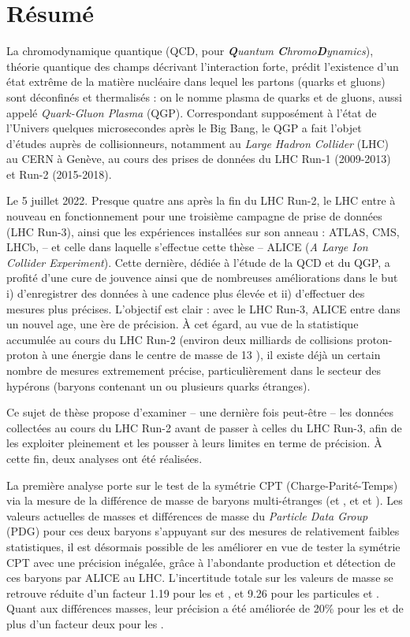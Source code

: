 \chapter*{Résumé}
    
La chromodynamique quantique (QCD, pour \textit{\textbf{Q}uantum \textbf{C}hromo\textbf{D}ynamics}), théorie quantique des champs décrivant l’interaction forte, prédit l’existence d’un état extrême de la matière nucléaire dans lequel les partons (quarks et gluons) sont déconfinés et thermalisés : on le nomme plasma de quarks et de gluons, aussi appelé \textit{Quark-Gluon Plasma} (QGP). Correspondant supposément à l’état de l’Univers quelques microsecondes après le Big Bang, le QGP a fait l’objet d’études auprès de collisionneurs, notamment au \textit{Large Hadron Collider} (LHC) au CERN à Genève, au cours des prises de données du LHC Run-1 (2009-2013) et Run-2 (2015-2018). 

Le 5 juillet 2022. Presque quatre ans après la fin du LHC Run-2, le LHC entre à nouveau en fonctionnement pour une troisième campagne de prise de données (LHC Run-3), ainsi que les expériences installées sur son anneau : ATLAS, CMS, LHCb, -- et celle dans laquelle s’effectue cette thèse -- ALICE (\textit{A Large Ion Collider Experiment}). Cette dernière, dédiée à l’étude de la QCD et du QGP, a profité d’une cure de jouvence ainsi que de nombreuses améliorations dans le but i) d’enregistrer des données à une cadence plus élevée et ii) d’effectuer des mesures plus précises. L’objectif est clair : avec le LHC Run-3, ALICE entre dans un nouvel age, une ère de précision. À cet égard, au vue de la statistique accumulée au cours du LHC Run-2 (environ deux milliards de collisions proton-proton à une énergie dans le centre de masse de 13 \tev), il existe déjà un certain nombre de mesures extremement précise, particulièrement dans le secteur des hypérons (baryons contenant un ou plusieurs quarks étranges).

Ce sujet de thèse propose d’examiner -- une dernière fois peut-être -- les données collectées au cours du LHC Run-2 avant de passer à celles du LHC Run-3, afin de les exploiter pleinement et les pousser à leurs limites en terme de précision. À cette fin, deux analyses ont été réalisées.

La première analyse porte sur le test de la symétrie CPT (Charge-Parité-Temps) via la mesure de la différence de masse de baryons multi-étranges (\rmXiM[$dss$] et , et \rmOmegaM[$sss$] et ). Les valeurs actuelles de masses et différences de masse du \textit{Particle Data Group} (PDG) pour ces deux baryons s’appuyant sur des mesures de relativement faibles statistiques, il est désormais possible de les améliorer en vue de tester la symétrie CPT avec une précision inégalée, grâce à l’abondante production et détection de ces baryons par ALICE au LHC. L’incertitude totale sur les valeurs de masse se retrouve réduite d’un facteur 1.19 pour les \rmXiM et \rmAxiP, et 9.26 pour les particules \rmOmegaM et \rmAomegaP. Quant aux différences masses, leur précision a été améliorée de 20\% pour les \rmXi et de plus d'un facteur deux pour les \rmOmega.

